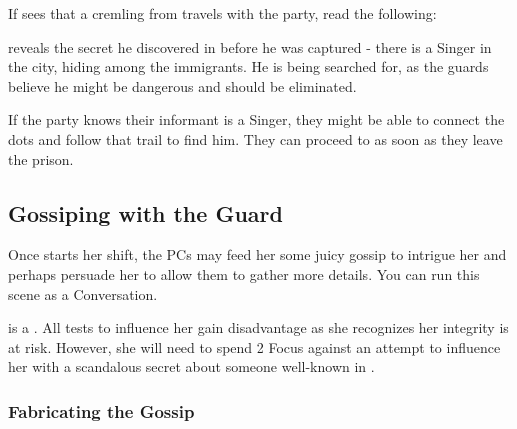 If \npcAxies{} sees that a cremling from \npcArclo{} travels with the party, read the following:


\npcAxies{} reveals the secret he discovered in \locationIndicium{} before he was captured - there is a Singer in the city, hiding among the immigrants. He is being searched for, as the guards believe he might be dangerous and should be eliminated.

If the party knows their informant is a Singer, they might be able to connect the dots and follow that trail to find him. They can proceed to  as soon as they leave the prison.


\subsection{Gossiping with the Guard}

Once \npcGossipGuard{} starts her shift, the PCs may feed her some juicy gossip to intrigue her and perhaps persuade her to allow them to gather more details. You can run this scene as a Conversation.

\npcGossipGuard{} is a \enemyGuardB{}.  
All tests to influence her gain disadvantage as she recognizes her integrity is at risk. However, she will need to spend 2 Focus against an attempt to influence her with a scandalous secret about someone well-known in \locationTashikk{}.



\subsubsection{Fabricating the Gossip}

